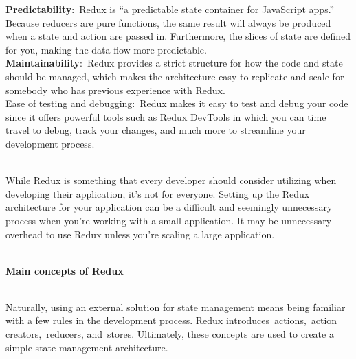\documentclass{article}
\begin{document}
\noindent \textbf{Predictability}:~Redux is ``a predictable state container for JavaScript apps.'' Because reducers are pure functions, the same result will always be produced when a state and action are passed in. Furthermore, the slices of state are defined for you, making the data flow more predictable.\\



\noindent \textbf{Maintainability}:~Redux provides a strict structure for how the code and state should be managed, which makes the architecture easy to replicate and scale for somebody who has previous experience with Redux.\\



\noindent Ease of testing and debugging:~Redux makes it easy to test and debug your code since it offers powerful tools such as Redux DevTools in which you can time travel to debug, track your changes, and much more to streamline your development process.

\noindent 
\\
\noindent While Redux is something that every developer should consider utilizing when developing their application, it's not for everyone. Setting up the Redux architecture for your application can be a difficult and seemingly unnecessary process when you're working with a small application. It may be unnecessary overhead to use Redux unless you're scaling a large application.

\noindent 
\\
\textbf{Main concepts of Redux}

\noindent 
\\
Naturally, using an external solution for state management means being familiar with a few rules in the development process. Redux introduces~actions,~action creators,~reducers, and~stores. Ultimately, these concepts are used to create a simple state management architecture.

\noindent 
\end{document}
